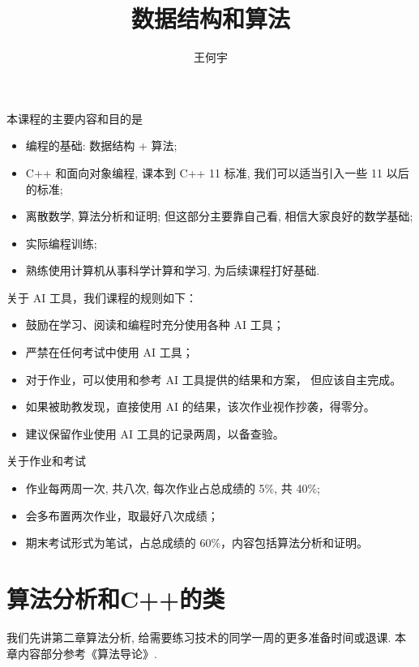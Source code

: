 \documentclass[a4paper]{ctexart}
\title{数据结构和算法}
\author{王何宇}
\date{}
\theoremstyle{definition}
\theoremstyle{definition}
\begin{document}
\maketitle
\pagestyle{empty}

本课程的主要内容和目的是
\begin{itemize}
\item 编程的基础: 数据结构 + 算法;
\item C++ 和面向对象编程, 课本到 C++ 11 标准, 我们可以适当引入一些 11 以后的标准;
\item 离散数学, 算法分析和证明; 但这部分主要靠自己看, 相信大家良好的数学基础; 
\item 实际编程训练;
\item 熟练使用计算机从事科学计算和学习, 为后续课程打好基础.
\end{itemize}

关于 AI 工具，我们课程的规则如下：
\begin{itemize}
  \item 鼓励在学习、阅读和编程时充分使用各种 AI 工具；
  \item 严禁在任何考试中使用 AI 工具；
  \item 对于作业，可以使用和参考 AI 工具提供的结果和方案，
  但应该自主完成。
  \item 如果被助教发现，直接使用 AI 的结果，该次作业视作抄袭，得零分。
  \item 建议保留作业使用 AI 工具的记录两周，以备查验。
\end{itemize}

关于作业和考试
\begin{itemize}
  \item 作业每两周一次, 共八次, 每次作业占总成绩的 5\%, 共 40\%;
  \item 会多布置两次作业，取最好八次成绩；
  \item 期末考试形式为笔试，占总成绩的 60\%，内容包括算法分析和证明。
\end{itemize}


\section{算法分析和C++的类}
我们先讲第二章算法分析, 给需要练习技术的同学一周的更多准备时间或退课. 
本章内容部分参考《算法导论》\cite{cormen2022introduction}.
\end{document}
